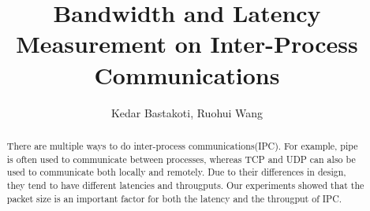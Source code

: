 \documentclass[10pt]{article}
\begin{document}
\title{Bandwidth and Latency Measurement on Inter-Process Communications}
\author{Kedar Bastakoti, Ruohui Wang}
\date{}

\maketitle

\begin{abstract}
    There are multiple ways to do inter-process communications(IPC). For example, pipe is often used to communicate between processes, whereas TCP and UDP can also be used to communicate both locally and remotely. Due to their differences in design, they tend to have different latencies and througputs. Our experiments showed that the packet size is an important factor for both the latency and the througput of IPC.
\end{abstract}










    
\end{document}
